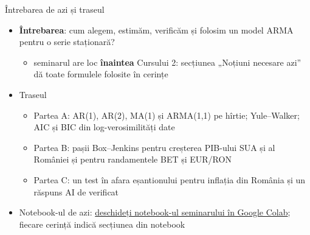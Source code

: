 \begin{frame}{Întrebarea de azi și traseul}
\itemsize{\small}
\begin{itemize}
    \item \textbf{Întrebarea}: cum alegem, estimăm, verificăm și folosim un model ARMA pentru o serie staționară?
    \begin{itemize}
        \item seminarul are loc \textbf{înaintea} Cursului 2: secțiunea „Noțiuni necesare azi” dă toate formulele folosite în cerințe
    \end{itemize}
    \item Traseul
    \begin{itemize}
        \item Partea A: AR(1), AR(2), MA(1) și ARMA(1,1) pe hîrtie; Yule--Walker; AIC și BIC din log-verosimilități date
        \item Partea B: pașii Box--Jenkins pentru creșterea PIB-ului SUA și al României și pentru randamentele BET și EUR/RON
        \item Partea C: un test în afara eșantionului pentru inflația din România și un răspuns AI de verificat
    \end{itemize}
    \item Notebook-ul de azi: \href{\nb}{deschideți notebook-ul seminarului în Google Colab}; fiecare cerință indică secțiunea din notebook
\end{itemize}
\end{frame}


